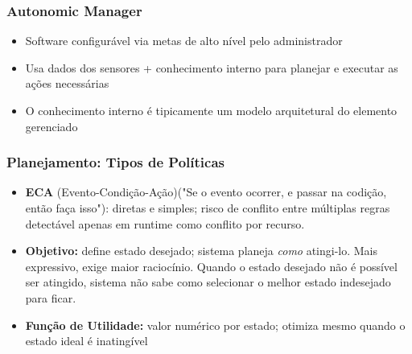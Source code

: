 \documentclass{beamer}
\begin{document}
  \begin{frame}
    \frametitle{Autonomic Manager}
    \begin{itemize}

      \item Software configurável via metas de alto nível pelo administrador
      \item Usa dados dos sensores + conhecimento interno para planejar e executar as ações necessárias
      \item O conhecimento interno é
  tipicamente um modelo arquitetural do elemento gerenciado
      
    \end{itemize}
    
  \end{frame}

  \begin{frame}
      \frametitle{Planejamento: Tipos de Políticas}
      \begin{itemize}
        \item \textbf{ECA} (Evento-Condição-Ação)("Se o evento ocorrer, e passar na codição, então faça isso"): diretas e simples; risco de conflito entre múltiplas regras detectável apenas em runtime como conflito por recurso.
        \item \textbf{Objetivo:} define estado desejado; sistema planeja \textit{como} atingi-lo. Mais expressivo, exige maior raciocínio. Quando o estado desejado não é possível ser atingido, sistema não sabe como selecionar o melhor estado indesejado para ficar.
        \item \textbf{Função de Utilidade:} valor numérico por estado; otimiza mesmo quando o estado ideal é inatingível
      \end{itemize}
  \end{frame}
\end{document}
